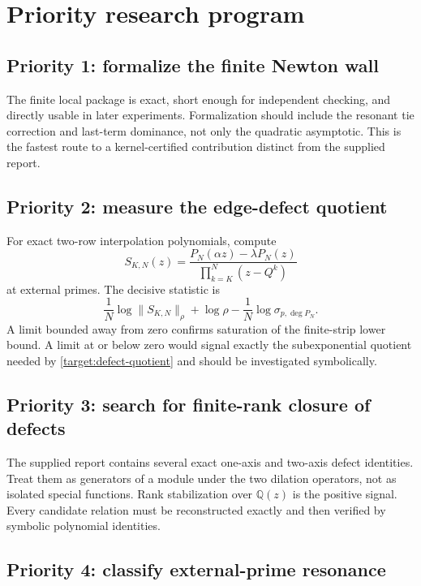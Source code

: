\documentclass[11pt,oneside]{article}
\theoremstyle{definition}
\newcommand{\Q}{\mathbb Q}
\begin{document}
\section{Priority research program}
\label{sec:priorities}

\subsection{Priority 1: formalize the finite Newton wall}

The finite local package is exact, short enough for independent checking, and directly
usable in later experiments.  Formalization should include the resonant tie correction and
last-term dominance, not only the quadratic asymptotic.  This is the fastest route to a
kernel-certified contribution distinct from the supplied report.

\subsection{Priority 2: measure the edge-defect quotient}

For exact two-row interpolation polynomials, compute
\[
 S_{K,N}(z)=
\frac{P_N(\alpha z)-\lambda P_N(z)}
 {\prod_{k=K}^{N}(z-Q^k)}
\]
at external primes.  The decisive statistic is
\[
 \frac1N\log\lVert S_{K,N}\rVert_\rho
 +\log\rho
 -\frac1N\log\sigma_{p,\deg P_N}.
\]
A limit bounded away from zero confirms saturation of the finite-strip lower bound.  A limit
at or below zero would signal exactly the subexponential quotient needed by
\cref{target:defect-quotient} and should be investigated symbolically.

\subsection{Priority 3: search for finite-rank closure of defects}

The supplied report contains several exact one-axis and two-axis defect identities.  Treat
them as generators of a module under the two dilation operators, not as isolated special
functions.  Rank stabilization over $\Q(z)$ is the positive signal.  Every candidate relation
must be reconstructed exactly and then verified by symbolic polynomial identities.

\subsection{Priority 4: classify external-prime resonance}
\end{document}
